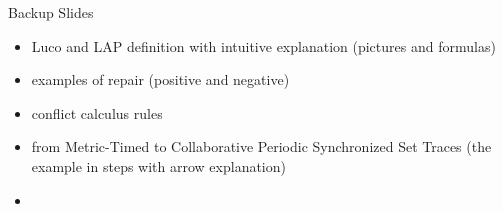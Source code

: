\documentclass[9pt,aspectratio=169]{beamer}
\newcommand{\logic}[1]{\ensuremath{\mathsf{#1}}\xspace}
\newcommand{\TDDLfm}{\logic{\mu MTNL}}
\begin{document}
\begin{frame}{Backup Slides}
\begin{itemize}
  \item Luco and LAP definition with intuitive explanation (pictures and formulas)
  \item examples of repair (positive and negative)
  \item conflict calculus rules
  \item from Metric-Timed to Collaborative Periodic Synchronized Set Traces (the example in steps with arrow explanation)
  \item  
\end{itemize}

\end{frame}
\end{document}
